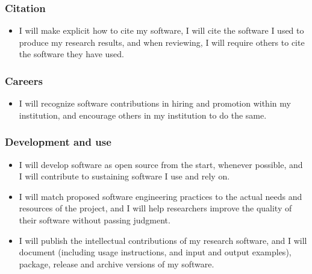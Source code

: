 \documentclass[a4paper,UKenglish]{dagman}
\renewcommand{\paragraph}[1]{\subsubsection*{#1}\xspace}
\begin{document}
\paragraph{Citation}
\begin{itemize}
\item I will make explicit how to cite my software, I will cite the software I used to produce my research results, and when reviewing, I will require others to cite the software they have used. 
\end{itemize}

\paragraph{Careers}
\begin{itemize}
\item I will recognize software contributions in hiring and promotion within my institution, and encourage others in my institution to do the same.
\end{itemize}

\paragraph{Development and use}
\begin{itemize}
\item I will develop software as open source from the start, whenever possible, and I will contribute to sustaining software I use and rely on.
\item I will match proposed software engineering practices to the actual needs and resources of the project, and I will help researchers improve the quality of their software without passing judgment.
\item I will publish the intellectual contributions of my research software, and I will document (including usage instructions, and input and output examples), package, release and archive versions of my software.
\end{itemize}
\end{document}
